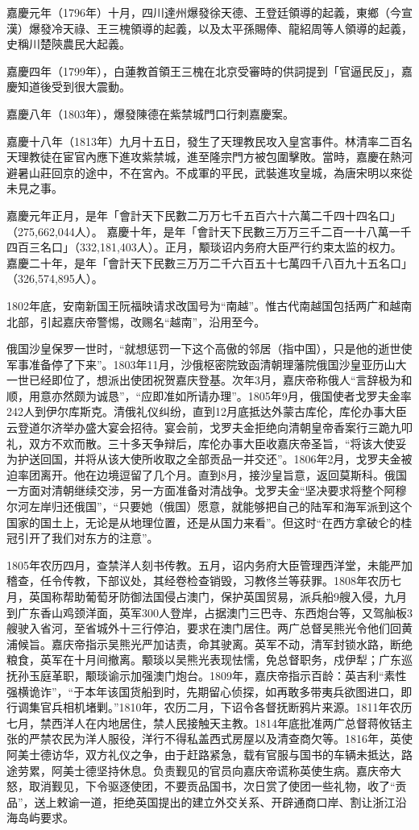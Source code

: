 嘉慶元年（1796年）十月，四川達州爆發徐天德、王登廷領導的起義，東鄉（今宣漢）爆發冷天祿、王三槐領導的起義，以及太平孫賜俸、龍紹周等人領導的起義，史稱川楚陝農民大起義。

嘉慶四年（1799年），白蓮教首領王三槐在北京受審時的供詞提到「官逼民反」，嘉慶知道後受到很大震動。

嘉慶八年（1803年），爆發陳德在紫禁城門口行刺嘉慶案。

嘉慶十八年（1813年）九月十五日，發生了天理教民攻入皇宮事件。林清率二百名天理教徒在宦官內應下進攻紫禁城，進至隆宗門方被包圍擊敗。當時，嘉慶在熱河避暑山莊回京的途中，不在宮內。不成軍的平民，武裝進攻皇城，為唐宋明以來從未見之事。

嘉慶元年正月，是年「會計天下民數二万万七千五百六十六萬二千四十四名口」（275,662,044人）。
嘉慶十年，是年「會計天下民數三万万三千二百一十八萬一千四百三名口」（332,181,403人）。正月，颙琰诏内务府大臣严行约束太监的权力。嘉慶二十年，是年「會計天下民數三万万二千六百五十七萬四千八百九十五名口」（326,574,895人）。

1802年底，安南新国王阮福映请求改国号为“南越”。惟古代南越国包括两广和越南北部，引起嘉庆帝警惕，改赐名“越南”，沿用至今。

俄国沙皇保罗一世时，“就想惩罚一下这个高傲的邻居（指中国），只是他的逝世使军事准备停了下来”。1803年11月，沙俄枢密院致函清朝理藩院俄国沙皇亚历山大一世已经即位了，想派出使团祝贺嘉庆登基。次年3月，嘉庆帝称俄人“言辞极为和顺，用意亦然颇为诚恳”，“应即准如所请办理”。1805年9月，俄国使者戈罗夫金率242人到伊尔库斯克。清俄礼仪纠纷，直到12月底抵达外蒙古库伦，库伦办事大臣云登道尔济举办盛大宴会招待。宴会前，戈罗夫金拒绝向清朝皇帝香案行三跪九叩礼，双方不欢而散。三十多天争辩后，库伦办事大臣收嘉庆帝圣旨，“将该大使妥为护送回国，并将从该大使所收取之全部贡品一并交还”。1806年2月，戈罗夫金被迫率团离开。他在边境逗留了几个月。直到8月，接沙皇旨意，返回莫斯科。俄国一方面对清朝继续交涉，另一方面准备对清战争。戈罗夫金“坚决要求将整个阿穆尔河左岸归还俄国”，“只要她（俄国）愿意，就能够把自己的陆军和海军派到这个国家的国土上，无论是从地理位置，还是从国力来看”。但这时“在西方拿破仑的桂冠引开了我们对东方的注意”。

1805年农历四月，查禁洋人刻书传教。五月，诏内务府大臣管理西洋堂，未能严加稽查，任令传教，下部议处，其经卷检查销毁，习教佟兰等获罪。1808年农历七月，英国称帮助葡萄牙防御法国侵占澳门，保护英国贸易，派兵船9艘入侵，九月到广东香山鸡颈洋面，英军300人登岸，占据澳门三巴寺、东西炮台等，又驾舢板3艘驶入省河，至省城外十三行停泊，要求在澳门居住。两广总督吴熊光令他们回黄浦候旨。嘉庆帝指示吴熊光严加诘责，命其驶离。英军不动，清军封锁水路，断绝粮食，英军在十月间撤离。颙琰以吴熊光表现怯懦，免总督职务，戍伊犁；广东巡抚孙玉庭革职，颙琰谕示加强澳门炮台。1809年，嘉庆帝指示百龄：英吉利“素性强横诡诈”，“于本年该国货船到时，先期留心侦探，如再敢多带夷兵欲图进口，即行调集官兵相机堵剿。”1810年，农历二月，下诏令各督抚断鸦片来源。1811年农历七月，禁西洋人在内地居住，禁人民接触天主教。1814年底批准两广总督蒋攸铦主张的严禁农民为洋人服役，洋行不得私盖西式房屋以及清查商欠等。1816年，英使阿美士德访华，双方礼仪之争，由于赶路紧急，载有官服与国书的车辆未抵达，路途劳累，阿美士德坚持休息。负责觐见的官员向嘉庆帝谎称英使生病。嘉庆帝大怒，取消觐见，下令驱逐使团，不要贡品国书，次日赏了使团一些礼物，收了“贡品”，送上敕谕一道，拒绝英国提出的建立外交关系、开辟通商口岸、割让浙江沿海岛屿要求。

